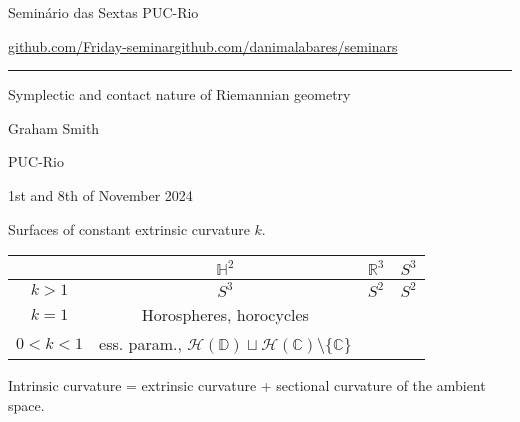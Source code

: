 


\begin{minipage}{\textwidth}
	\begin{minipage}{1\textwidth}
		Semin\'ario das Sextas \hfill PUC-Rio
		
		{\small\href{https://github.com/Friday-seminar/}{github.com/Friday-seminar}\hfill\href{https://github.com/danimalabares/seminars}{github.com/danimalabares/seminars}}
		\end{minipage}
\end{minipage}\vspace{.2cm}\hrule

\vspace{10pt}

{\Huge Symplectic and contact nature of Riemannian geometry}

\hfill{\Large Graham Smith}

\hfill{\Large PUC-Rio}

\hfill{\large 1st and 8th of November 2024}

Surfaces of constant extrinsic curvature $k$.

\begin{table}[H]
	\centering
	\begin{tabular}{c |c| c| c}
	&$\mathbb{H}^2$ &$\mathbb{R}^3$&$S^3$\\\hline
		$k>1$&  $S^3$&$S^2$&$S^2$\\
		$k=1$&Horospheres, horocycles& &\\
		$0<k<1$&ess. param., $\mathcal{H}(\mathbb{D})\sqcup \mathcal{H}(\mathbb{C})\setminus \{\mathbb{C}\}$
	\end{tabular}
\end{table}

\begin{remark}\leavevmode
	Intrinsic curvature = extrinsic curvature + sectional curvature of the ambient space.
\end{remark}

